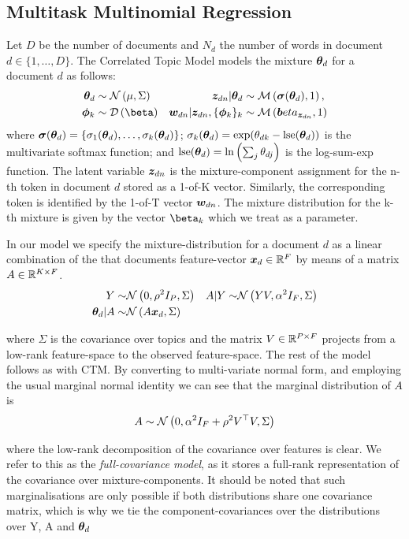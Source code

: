 \subsection{Multitask Multinomial Regression}
Let $D$ be the number of documents and $N_d$ the number of words in document $d\in\{1,\ldots,D\}$. The Correlated Topic Model models the mixture ${ \bm \theta_d }$ for a document $d$ as follows:
\begin{align}
\thd &\sim \nor{\mu}{\Sigma}
&\zdn | \thd &\sim \muln {\vv{\sigma}(\thd)}{1} ,\\
\pk &\sim\dir{\vv{\beta}}
&\wdn | \zdn , \{\pk\}_k &\sim \muln{\vv{beta}_{\zdn}}{1}
\end{align}
where $\bm \sigma({ \bm \theta_d }) = \{\sigma_1({ \bm \theta_d }), \ldots, \sigma_k({ \bm \theta_d })\}$; $\sigma_k({ \bm \theta_d }) = \exp({ \theta_{dk} } - \text{lse}({ \bm \theta_d }))$ is the multivariate softmax function; and $\text{lse}({ \bm \theta_d }) = \ln\left(\sum_j { \theta_{dj} } \right)$ is the log-sum-exp function. The latent variable ${ \bm z_{dn} }$ is the mixture-component assignment for the n-th token in document $d$ stored as a 1-of-K vector. Similarly, the corresponding token is identified by the 1-of-T vector ${ \bm w_{dn} }$. The mixture distribution for the k-th mixture is given by the vector $\vv{\beta}_k$ which we treat as a parameter.

In our model we specify the mixture-distribution for a document $d$ as a linear combination of the that documents feature-vector ${ \bm x_d } \in { \mathbb{R}^{F} }$ by means of a matrix $A \in { \mathbb{R}^{K \times F} }$.
\begin{align}
Y \sim & \mathcal{N} \left(0, \rho^2 I_P, \Sigma\right) & A|Y \sim & \mathcal{N} \left(YV, \alpha^2 I_F, \Sigma\right) \\
{ \bm \theta_d } | A \sim & \mathcal{N} \left( {A\bm x_d}, {\Sigma} \right)
\end{align}

where $\Sigma$ is the covariance over topics and the matrix $V \in { \mathbb{R}^{P \times F} }$ projects from a low-rank feature-space to the observed feature-space. The rest of the model follows as with CTM. By converting to multi-variate normal form, and employing the usual marginal normal identity\cite{Bishop2006}  we can see that the marginal distribution of $A$ is
\begin{equation}
A \sim \mathcal{N} \left(0, \alpha^2 I_F + \rho^2 V^\top V, \Sigma\right)
\end{equation}

where the low-rank decomposition of the covariance over features is clear. We refer to this as the \emph{full-covariance model}, as it stores a full-rank representation of the covariance over mixture-components. It should be noted that such marginalisations are only possible if both distributions share one covariance matrix, which is why we tie the component-covariances over the distributions over Y, A and ${ \bm \theta_d }$

